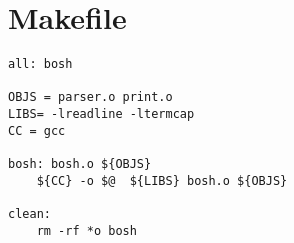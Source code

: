 \chapter{Makefile}
\begin{lstlisting}
all: bosh

OBJS = parser.o print.o
LIBS= -lreadline -ltermcap
CC = gcc

bosh: bosh.o ${OBJS}
	${CC} -o $@  ${LIBS} bosh.o ${OBJS}

clean:
	rm -rf *o bosh
\end{lstlisting}